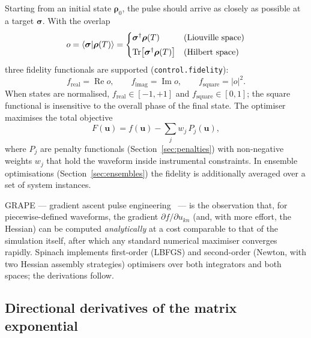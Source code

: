 \documentclass[11pt,a4paper]{article}
\newcommand{\code}[1]{\texttt{#1}}
\newcommand{\Tr}{\operatorname{Tr}}
\begin{document}
Starting from an initial state $\boldsymbol{\rho}_0$, the pulse should
arrive as closely as possible at a target $\boldsymbol{\sigma}$. With the
overlap
\begin{equation}
  o=\braket{\boldsymbol{\sigma}|\boldsymbol{\rho}(T)}
  =\begin{cases}
     \boldsymbol{\sigma}^{\dagger}\boldsymbol{\rho}(T)
       & \text{(Liouville space)}\\[1mm]
     \Tr\!\left[\boldsymbol{\sigma}^{\dagger}\boldsymbol{\rho}(T)\right]
       & \text{(Hilbert space)}
   \end{cases}
  \label{eq:overlap}
\end{equation}
three fidelity functionals are supported
(\code{control.fidelity}):
\begin{equation}
  f_{\mathrm{real}}=\operatorname{Re}o,\qquad
  f_{\mathrm{imag}}=\operatorname{Im}o,\qquad
  f_{\mathrm{square}}=|o|^{2}.
  \label{eq:fidelities}
\end{equation}
When states are normalised, $f_{\mathrm{real}}\in[-1,+1]$ and
$f_{\mathrm{square}}\in[0,1]$; the square functional is insensitive to the
overall phase of the final state. The optimiser maximises the total
objective
\begin{equation}
  F(\mathbf{u})=f(\mathbf{u})-\sum_{j} w_j\,P_j(\mathbf{u}),
  \label{eq:objective}
\end{equation}
where $P_j$ are penalty functionals (Section~\ref{sec:penalties}) with
non-negative weights $w_j$ that hold the waveform inside instrumental
constraints. In ensemble optimisations (Section~\ref{sec:ensembles}) the
fidelity is additionally averaged over a set of system instances.

GRAPE --- gradient ascent pulse engineering~\cite{khaneja2005} --- is the
observation that, for piecewise-defined waveforms, the gradient
$\partial f/\partial u_{kn}$ (and, with more effort, the Hessian) can be
computed \emph{analytically} at a cost comparable to that of the
simulation itself, after which any standard numerical maximiser converges
rapidly. Spinach implements first-order (LBFGS) and second-order (Newton,
with two Hessian assembly strategies) optimisers over both integrators and
both spaces; the derivations follow.

\subsection{Directional derivatives of the matrix exponential}
\label{sec:dirdiff}
\end{document}

